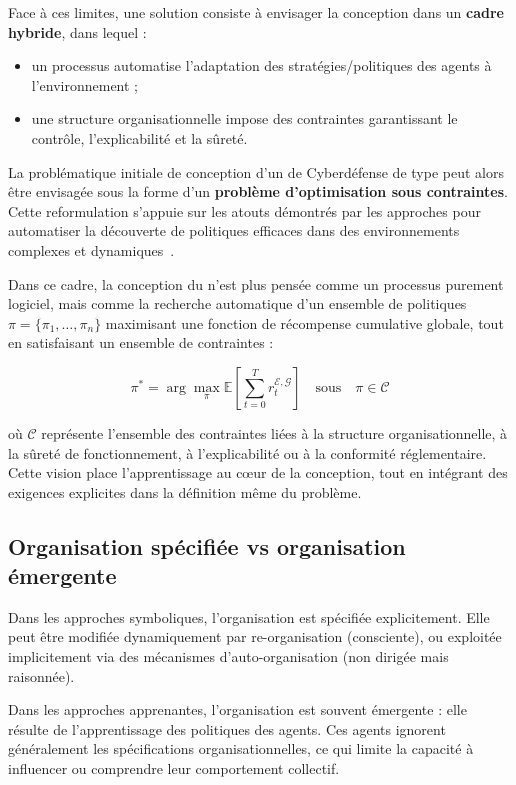 Face à ces limites, une solution consiste à envisager la conception  dans un \textbf{cadre hybride}, dans lequel :
\begin{itemize}
    \item un processus automatise l'adaptation des stratégies/politiques des agents à l'environnement ;
    \item une structure organisationnelle impose des contraintes garantissant le contrôle, l'explicabilité et la sûreté.
\end{itemize}

La problématique initiale de conception d'un  de Cyberdéfense de type  peut alors être envisagée sous la forme d'un \textbf{problème d'optimisation sous contraintes}. Cette reformulation s'appuie sur les atouts démontrés par les approches  pour automatiser la découverte de politiques efficaces dans des environnements complexes et dynamiques~\cite{Zhang2021, Papoudakis2021}.

Dans ce cadre, la conception du  n'est plus pensée comme un processus purement logiciel, mais comme la recherche automatique d'un ensemble de politiques \(\pi = \{\pi_1, \dots, \pi_n\}\) maximisant une fonction de récompense cumulative globale, tout en satisfaisant un ensemble de contraintes :

\begin{equation}
    \pi^* = \arg\max_{\pi} \mathbb{E}\left[\sum_{t=0}^{T} r^{\mathcal{E},\mathcal{G}}_t\right] \quad \text{sous} \quad \pi \in \mathcal{C}
\end{equation}

où \(\mathcal{C}\) représente l'ensemble des contraintes liées à la structure organisationnelle, à la sûreté de fonctionnement, à l'explicabilité ou à la conformité réglementaire. Cette vision place l'apprentissage au cœur de la conception, tout en intégrant des exigences explicites dans la définition même du problème.


\subsection*{Organisation spécifiée vs organisation émergente}

Dans les approches symboliques, l'organisation est spécifiée explicitement. Elle peut être modifiée dynamiquement par re-organisation (consciente), ou exploitée implicitement via des mécanismes d'auto-organisation (non dirigée mais raisonnée).

Dans les approches apprenantes, l'organisation est souvent émergente : elle résulte de l'apprentissage des politiques des agents. Ces agents ignorent généralement les spécifications organisationnelles, ce qui limite la capacité à influencer ou comprendre leur comportement collectif.

